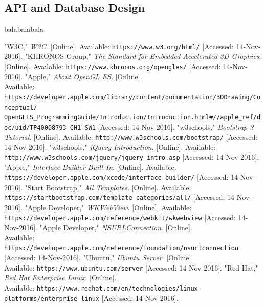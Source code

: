 \documentclass[letterpaper, 10pt,titlepage]{article}
\begin{document}
\subsection{API and Database Design}
balabalabala





\newpage %
\begin{thebibliography}{22}

"W3C," \textit{W3C}. [Online]. Available:
\texttt{https://www.w3.org/html/} [Accessed: 14-Nov-2016].
"KHRONOS Group," \textit{The Standard for Embedded Accelerated 3D Graphics}. [Online]. Available:
\texttt{https://www.khronos.org/opengles/} [Accessed: 14-Nov-2016].
"Apple," \textit{About OpenGL ES}. [Online]. \\
Available:
\texttt{https://developer.apple.com/library/content/documentation/3DDrawing/Conceptual/\\OpenGLES\_ProgrammingGuide/Introduction/Introduction.html\#//apple\_ref/doc/uid/TP40008793-CH1-SW1} [Accessed: 14-Nov-2016].
"w3schools," \textit{Bootstrap 3 Tutorial}. [Online]. Available:
\texttt{http://www.w3schools.com/bootstrap/} [Accessed: 14-Nov-2016].
"w3schools," \textit{jQuery Introduction}. [Online]. Available:
\texttt{http://www.w3schools.com/jquery/jquery\_intro.asp} [Accessed: 14-Nov-2016].
"Apple," \textit{Interface Builder Built-In}. [Online]. Available:
\texttt{https://developer.apple.com/xcode/interface-builder/} [Accessed: 14-Nov-2016].
"Start Bootstrap," \textit{All Templates}. [Online]. Available:
\texttt{https://startbootstrap.com/template-categories/all/} [Accessed: 14-Nov-2016].
"Apple Developer," \textit{WKWebView}. [Online]. Available:
\texttt{https://developer.apple.com/reference/webkit/wkwebview} [Accessed: 14-Nov-2016].
"Apple Developer," \textit{NSURLConnection}. [Online]. 
\\Available: \texttt{https://developer.apple.com/reference/foundation/nsurlconnection} [Accessed: 14-Nov-2016].
"Ubuntu," \textit{Ubuntu Server}. [Online]. 
\\Available: \texttt{https://www.ubuntu.com/server} [Accessed: 14-Nov-2016].
"Red Hat," \textit{Red Hat Enterprise Linux}. [Online]. 
\\Available: \texttt{https://www.redhat.com/en/technologies/linux-platforms/enterprise-linux} [Accessed: 14-Nov-2016].

\end{thebibliography}
\end{document}
